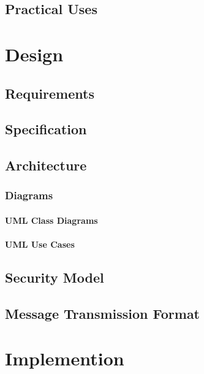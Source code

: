 \documentclass[a4paper,12pt]{report}
\begin{document}


\section{Practical Uses}



\chapter{Design}

\section{Requirements}

\section{Specification}

\section{Architecture}

\subsection{Diagrams}

\subsubsection{UML Class Diagrams}

\subsubsection{UML Use Cases}

\section{Security Model}

\section{Message Transmission Format}


\chapter{Implemention}
\end{document}
